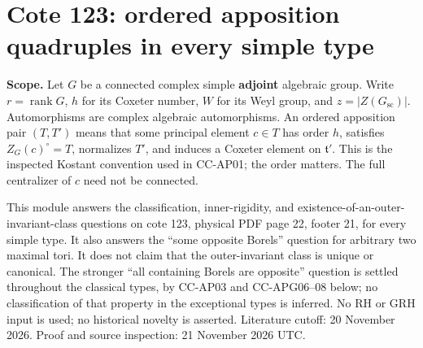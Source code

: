\documentclass[11pt,a4paper]{article}
\theoremstyle{definition}\newtheorem{definition}[theorem]{Definition}
\theoremstyle{remark}\newtheorem{remark}[theorem]{Remark}
\begin{document}
\section{Cote 123: ordered apposition quadruples in every simple
type}\label{cote-123-ordered-apposition-quadruples-in-every-simple-type}

\textbf{Scope.} Let \(G\) be a connected complex simple \textbf{adjoint}
algebraic group. Write \(r=\operatorname{rank}G\), \(h\) for its Coxeter
number, \(W\) for its Weyl group, and \(z=|Z(G_{\mathrm{sc}})|\).
Automorphisms are complex algebraic automorphisms. An ordered apposition
pair \((T,T')\) means that some principal element \(c\in T\) has order
\(h\), satisfies \(Z_G(c)^\circ=T\), normalizes \(T'\), and induces a
Coxeter element on \(\mathfrak t'\). This is the inspected Kostant
convention used in CC-AP01; the order matters. The full centralizer of
\(c\) need not be connected.

This module answers the classification, inner-rigidity, and
existence-of-an-outer-invariant-class questions on cote 123, physical
PDF page 22, footer 21, for every simple type. It also answers the
``some opposite Borels'' question for arbitrary two maximal tori. It
does not claim that the outer-invariant class is unique or canonical.
The stronger ``all containing Borels are opposite'' question is settled
throughout the classical types, by CC-AP03 and CC-APG06--08 below; no
classification of that property in the exceptional types is inferred. No
RH or GRH input is used; no historical novelty is asserted. Literature
cutoff: 20 November 2026. Proof and source inspection: 21 November 2026
UTC.
\end{document}
